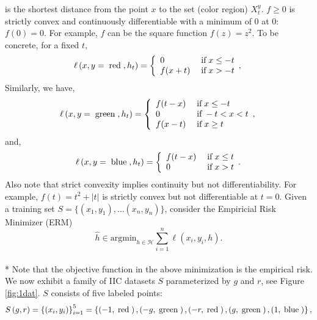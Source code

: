 \documentclass{article}
\def\H{\mathcal H}
\def\argmin{\mathrm{argmin}}
\begin{document}
 is the shortest distance from the point $x$ to the set (color region) $X^y_t$.
 $f \ge 0$ is strictly convex and continuously differentiable with a minimum of 0 at 0: $f(0) = 0$.
 For example, $f$ can be the square function $f(z)=z^2$.
To be concrete, for a fixed $t, $
\begin{equation} \ell\left(x, y = \text{\;red\;}, h_{t}\right) =\left\{ \begin{array}{ll}
0& \text{\;if\;} x \leq  -t \\
f(x + t)& \text{\;if\;} x > -t \\
\end{array},\right. \end{equation}
Similarly, we have,
\begin{equation} \ell\left(x, y = \text{\;green\;}, h_{t}\right) =\left\{ \begin{array}{ll}
f(t - x)& \text{\;if\;} x \leq  -t \\
0& \text{\;if\;} -t < x < t \\
f(x - t)& \text{\;if\;} x \geq  t \\
\end{array},\right. \end{equation}
and,
\begin{equation} \ell\left(x, y = \text{\;blue\;}, h_{t}\right) =\left\{ \begin{array}{ll}
f(t - x)& \text{\;if\;} x \leq  t \\
0& \text{\;if\;} x > t \\
\end{array}.\right. \end{equation}
Also note that strict convexity implies continuity but not differentiability. For example, $f\left(t\right)  = t^{2} + \left| t \right|$ is strictly convex but not differentiable at $t  = 0$.
 Given a training set $S=\{(x_1,y_1), \ldots (x_n, y_n)\}$, consider the Empiricial Risk Minimizer (ERM)
 \begin{equation}
 \hat h \in \argmin_{h \in \H} \sum_{i=1}^n \ell(x_i, y_i, h).
 \end{equation}
\\* Note that the objective function in the above minimization is the empirical risk.
\newline \newline
We now exhibit a family of IIC datasets $S $ parameterized by $g $ and $r $, see Figure \ref{fig:1dat}. $S $ consists of five labeled points:
\begin{equation} 
S\left(g, r\right)  = \left\{\left(x_{i}, y_{i}\right)\right\}_{i=1}^{5} = \left\{\left(-1, \text{\;red\;}\right), \left(-g, \text{\;green\;}\right), \left(-r, \text{\;red\;}\right), \left(g, \text{\;green\;}\right), \left(1, \text{\;blue\;}\right)\right\},
\end{equation}
\end{document}
